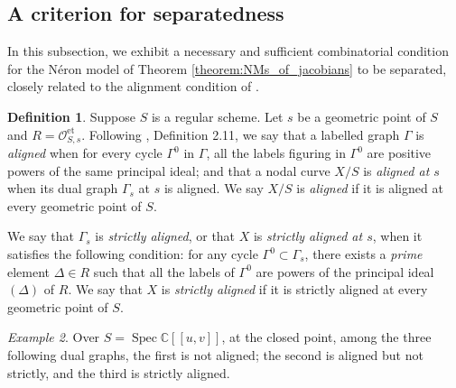 \documentclass[a4paper,12pt]{amsart} %
\numberwithin{equation}{subsection}
\newcommand{\on}[1]{\operatorname{#1}}
\newcommand{\Spec}{\operatorname{Spec}}
\theoremstyle{definition}
\newtheorem{definition}{Definition}[section]
\theoremstyle{plain}%
\theoremstyle{remark}
\newtheorem{example}[definition]{Example}
\renewcommand{\O}{\mathcal{O}}
\begin{document}
\subsection{A criterion for separatedness}

In this subsection, we exhibit a necessary and sufficient combinatorial condition for the Néron model of Theorem \ref{theorem:NMs_of_jacobians} to be separated, closely related to the alignment condition of \cite{Holmes}.

\begin{definition}\label{c-strict alignment}
	Suppose $S$ is a regular scheme. Let $s$ be a geometric point of $S$ and $R=\O_{S,s}^{\on{et}}$. Following \cite{Holmes}, Definition 2.11, we say that a labelled graph $\Gamma$ is \textit{aligned} when for every cycle $\Gamma^0$ in $\Gamma$, all the labels figuring in $\Gamma^0$ are positive powers of the same principal ideal; and that a nodal curve $X/S$ is \textit{aligned at $s$} when its dual graph $\Gamma_s$ at $s$ is aligned. We say $X/S$ is \emph{aligned} if it is aligned at every geometric point of $S$.

	We say that $\Gamma_s$ is \textit{strictly aligned}, or that $X$ is \textit{strictly aligned at $s$}, when it satisfies the following condition: for any cycle $\Gamma^0\subset\Gamma_s$, there exists a \emph{prime} element $\Delta\in R$ such that all the labels of $\Gamma^0$ are powers of the principal ideal $(\Delta)$ of $R$. We say that $X$ is \textit{strictly aligned} if it is strictly aligned at every geometric point of $S$.
\end{definition}

\begin{example}
Over $S=\Spec\mathbb{C}[[u,v]]$, at the closed point, among the three following dual graphs, the first is not aligned; the second is aligned but not strictly, and the third is strictly aligned.

\begin{center}
\end{center}


\begin{center}
\end{center}

\begin{center}
\end{center}
\end{example}
\end{document}
